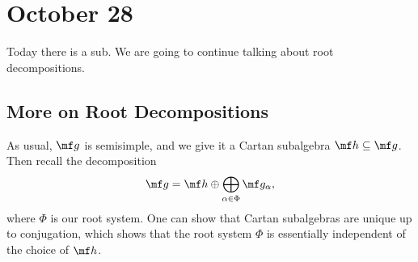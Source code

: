 \documentclass[../notes.tex]{subfiles}
\begin{document}
\section{October 28}
Today there is a sub. We are going to continue talking about root decompositions.

\subsection{More on Root Decompositions}
As usual, $\mf g$ is semisimple, and we give it a Cartan subalgebra $\mf h\subseteq\mf g$. Then recall the decomposition
\[\mf g=\mf h\oplus\bigoplus_{\alpha\in\Phi}\mf g_{\alpha},\]
where $\Phi$ is our root system. One can show that Cartan subalgebras are unique up to conjugation, which shows that the root system $\Phi$ is essentially independent of the choice of $\mf h$.
\end{document}
